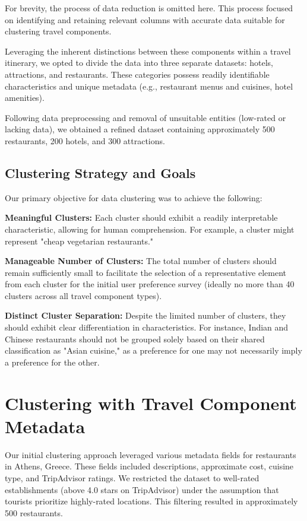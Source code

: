 \documentclass[12pt,a4paper]{report}
\begin{document}
For brevity, the process of data reduction is omitted here.  This process focused on identifying and retaining relevant columns with accurate data suitable for clustering travel components.

Leveraging the inherent distinctions between these components within a travel itinerary, we opted to divide the data into three separate datasets: hotels, attractions, and restaurants.  These categories possess readily identifiable characteristics and unique metadata (e.g., restaurant menus and cuisines, hotel amenities).

Following data preprocessing and removal of unsuitable entities (low-rated or lacking data), we obtained a refined dataset containing approximately 500 restaurants, 200 hotels, and 300 attractions.

\subsection{Clustering Strategy and Goals}

Our primary objective for data clustering was to achieve the following:

\begin{description}
\item{\textbf{Meaningful Clusters:} Each cluster should exhibit a readily interpretable characteristic, allowing for human comprehension. For example, a cluster might represent "cheap vegetarian restaurants."}
\item{\textbf{Manageable Number of Clusters:} The total number of clusters should remain sufficiently small to facilitate the selection of a representative element from each cluster for the initial user preference survey (ideally no more than 40 clusters across all travel component types).}
\item{\textbf{Distinct Cluster Separation:} Despite the limited number of clusters, they should exhibit clear differentiation in characteristics. For instance, Indian and Chinese restaurants should not be grouped solely based on their shared classification as "Asian cuisine," as a preference for one may not necessarily imply a preference for the other.}
\end{description}

\section{Clustering with Travel Component Metadata}
Our initial clustering approach leveraged various metadata fields for restaurants in Athens, Greece.  These fields included descriptions, approximate cost, cuisine type, and TripAdvisor ratings.  We restricted the dataset to well-rated establishments (above 4.0 stars on TripAdvisor) under the assumption that tourists prioritize highly-rated locations.  This filtering resulted in approximately 500 restaurants.
\end{document}
